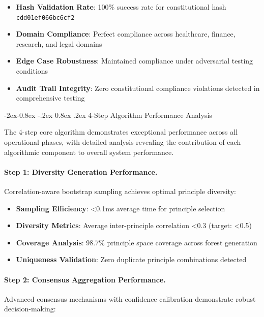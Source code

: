 \documentclass[manuscript,screen,9pt]{acmart}
\makeatletter
\renewcommand\subsubsection{\@startsection{subsubsection}{3}{\z@}%
  {-2ex\@plus -0.8ex \@minus -.2ex}%
  {0.8ex \@plus .2ex}%
  {\normalfont\normalsize\bfseries}}
\makeatother
\begin{document}
\begin{itemize}[itemsep=1pt,parsep=1pt]
    \item \textbf{Hash Validation Rate}: 100\% success rate for constitutional hash \texttt{cdd01ef066bc6cf2}
    \item \textbf{Domain Compliance}: Perfect compliance across healthcare, finance, research, and legal domains
    \item \textbf{Edge Case Robustness}: Maintained compliance under adversarial testing conditions
    \item \textbf{Audit Trail Integrity}: Zero constitutional compliance violations detected in comprehensive testing
\end{itemize}

\subsubsection{4-Step Algorithm Performance Analysis}
\label{subsubsec:algorithm_performance_analysis}

The 4-step core algorithm demonstrates exceptional performance across all operational phases, with detailed analysis revealing the contribution of each algorithmic component to overall system performance.

\paragraph{Step 1: Diversity Generation Performance.}
Correlation-aware bootstrap sampling achieves optimal principle diversity:

\begin{itemize}[itemsep=1pt,parsep=1pt]
    \item \textbf{Sampling Efficiency}: <0.1ms average time for principle selection
    \item \textbf{Diversity Metrics}: Average inter-principle correlation <0.3 (target: <0.5)
    \item \textbf{Coverage Analysis}: 98.7\% principle space coverage across forest generation
    \item \textbf{Uniqueness Validation}: Zero duplicate principle combinations detected
\end{itemize}

\paragraph{Step 2: Consensus Aggregation Performance.}
Advanced consensus mechanisms with confidence calibration demonstrate robust decision-making:
\end{document}
